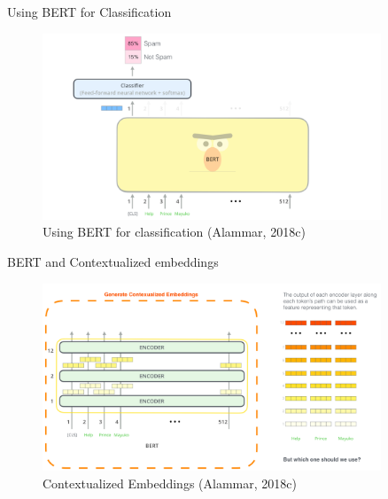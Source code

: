 \documentclass[10pt]{beamer}
\begin{document}

\begin{frame}{Using BERT for Classification}

\begin{figure}[h]
\centering
\includegraphics[width=0.9\textwidth]{fig/bert-classifier.png}
\caption{Using BERT for classification (Alammar, 2018c)}
\end{figure}

\end{frame}

\begin{frame}{BERT and Contextualized embeddings}

\begin{figure}[h]
\centering
\includegraphics[width=0.9\textwidth]{fig/bert-contexualized-embeddings.png}
\caption{Contextualized Embeddings (Alammar, 2018c)}
\end{figure}

\end{frame}
\end{document}
